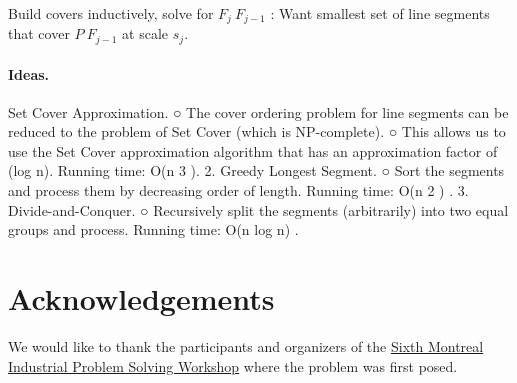 \documentclass[11pt,a4paper]{article}
\begin{document}
Build covers inductively, solve for $F_j \ F_{j-1}$ :	
Want smallest set of line segments that cover $P \ F_{j-1}$ at scale $s_j$.

\paragraph{Ideas.}
Set Cover Approximation.
○ The cover ordering problem for line segments can be
reduced to the problem of Set Cover (which is NP-complete).
○ This allows us to use the Set Cover approximation algorithm
that has an approximation factor of (log n).
Running time: O(n 3 ).
2. Greedy Longest Segment.
○ Sort the segments and process them by decreasing order of
length. Running time: O(n 2 ) .
3. Divide-and-Conquer.
○ Recursively split the segments (arbitrarily) into two equal
groups and process. Running time: O(n log n) .


\vskip2cm

\section*{Acknowledgements}
We would like to thank the participants and organizers of the \href{http://www.crm.umontreal.ca/probindustriels2015/}{Sixth Montreal Industrial Problem Solving Workshop}
where the problem was first posed. 




\end{document}
